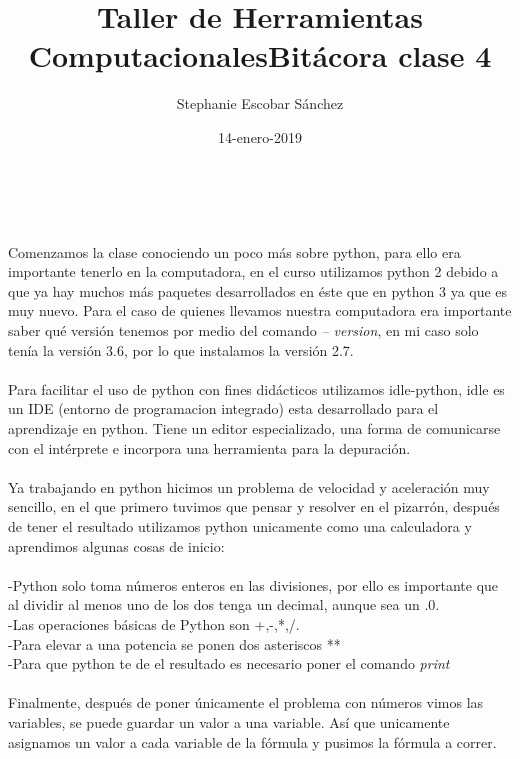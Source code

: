 \documentclass [letterpaper, 12 pts, oneside]{article}
\title{\Huge Taller de Herramientas Computacionales}
\author{Stephanie Escobar Sánchez}
\date{14-enero-2019}
\begin{document}
	\maketitle

	\newpage
	
	\title{\Huge Bitácora clase 4} \\
	\\
	Comenzamos la clase conociendo un poco más sobre python, para ello era importante tenerlo en la computadora, en el curso utilizamos python 2 debido a que ya hay muchos más paquetes desarrollados en éste que en python 3 ya que es muy nuevo. Para el caso de quienes llevamos nuestra computadora era importante saber qué versión tenemos por medio del comando \textit{-- version}, en mi caso solo tenía la versión 3.6, por lo que instalamos la versión 2.7. \\
	\\
	Para facilitar el uso de python con fines didácticos utilizamos idle-python, idle es un IDE (entorno de programacion integrado) esta desarrollado para el aprendizaje en python. Tiene un editor especializado, una forma de comunicarse con el intérprete e incorpora una herramienta para la depuración.\\
	\\
	Ya trabajando en python hicimos un problema de velocidad y aceleración muy sencillo, en el que primero tuvimos que pensar y resolver en el pizarrón, después de tener el resultado utilizamos python unicamente como una calculadora y aprendimos algunas cosas de inicio:\\
	\\
	-Python solo toma números enteros en las divisiones, por ello es importante que al dividir al menos uno de los dos tenga un decimal, aunque sea un .0.\\
	-Las operaciones básicas de Python son +,-,*,/.\\
	-Para elevar a una potencia se ponen dos asteriscos **\\
	-Para que python te de el resultado es necesario poner el comando \textit{print}\\
	\\
	Finalmente, después de poner únicamente el problema con números vimos las variables, se puede guardar un valor a una variable. Así que unicamente asignamos un valor a cada variable de la fórmula y pusimos la fórmula a correr. \\
	 
	
	
	
\end{document}
